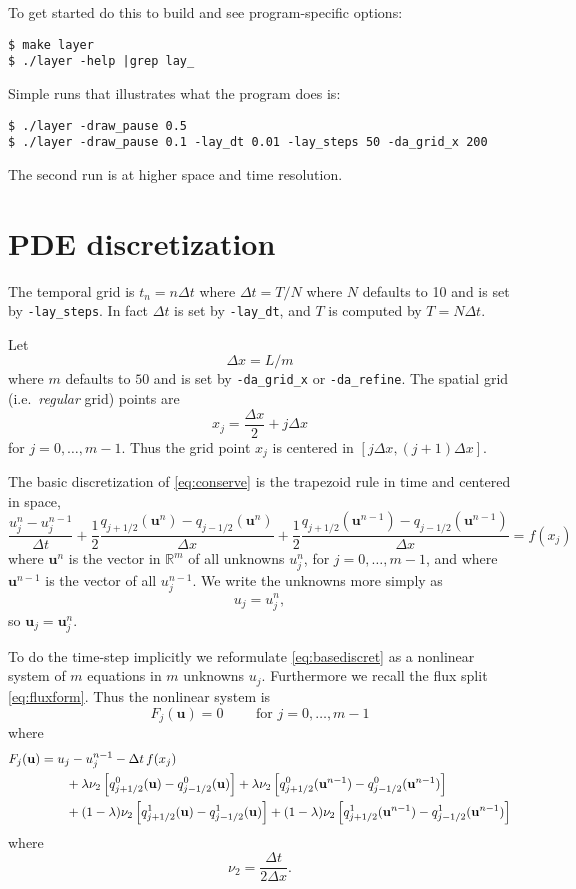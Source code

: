 \documentclass[11pt]{amsart}
\newcommand\bu{\mathbf{u}}
\newcommand\RR{\mathbb{R}}
\begin{document}
To get started do this to build and see program-specific options:
\begin{verbatim}
$ make layer
$ ./layer -help |grep lay_
\end{verbatim}
Simple runs that illustrates what the program does is:
\begin{verbatim}
$ ./layer -draw_pause 0.5
$ ./layer -draw_pause 0.1 -lay_dt 0.01 -lay_steps 50 -da_grid_x 200
\end{verbatim}
The second run is at higher space and time resolution.

\section{PDE discretization}

The temporal grid is $t_n = n\Delta t$ where $\Delta t = T/N$ where $N$ defaults to 10 and is set by \verb|-lay_steps|.  In fact $\Delta t$ is set by \verb|-lay_dt|, and $T$ is computed by $T=N\Delta t$.

Let
  $$\Delta x = L / m$$
where $m$ defaults to $50$ and is set by \verb|-da_grid_x| or \verb|-da_refine|.  The spatial grid (i.e.~\emph{regular} grid) points are
    $$x_j = \frac{\Delta x}{2} + j \Delta x$$
for $j=0,\dots,m-1$.  Thus the grid point $x_j$ is centered in $[j\Delta x,(j+1)\Delta x]$.

The basic discretization of \eqref{eq:conserve} is the trapezoid rule in time and centered in space,
\begin{equation}
\frac{u_j^n - u_j^{n-1}}{\Delta t} + \frac{1}{2} \frac{q_{j+1/2}(\bu^n) - q_{j-1/2}(\bu^n)}{\Delta x} + \frac{1}{2} \frac{q_{j+1/2}(\bu^{n-1}) - q_{j-1/2}(\bu^{n-1})}{\Delta x} = f(x_j) \label{eq:basediscret}
\end{equation}
where $\bu^n$ is the vector in $\RR^m$ of all unknowns $u_j^n$, for $j=0,\dots,m-1$, and where $\bu^{n-1}$ is the vector of all $u_j^{n-1}$.  We write the unknowns more simply as
  $$u_j = u_j^n,$$
so $\bu_j = \bu_j^n$.

To do the time-step implicitly we reformulate \eqref{eq:basediscret} as a nonlinear system of $m$ equations in $m$ unknowns $u_j$.  Furthermore we recall the flux split \eqref{eq:fluxform}.  Thus the nonlinear system is
\begin{equation}
F_j(\bu) = 0 \qquad \text{ for } j = 0,\dots,m-1
\end{equation}
where
\begin{align}
F_j(\bu) &= u_j - u_j^{n-1} - \Delta t\,f(x_j)  \label{eq:defineFj} \\
   &\qquad + \lambda \nu_2 \left[q^0_{j+1/2}(\bu) - q^0_{j-1/2}(\bu)\right] + \lambda \nu_2 \left[q^0_{j+1/2}(\bu^{n-1}) - q^0_{j-1/2}(\bu^{n-1})\right] \notag \\
   &\qquad + (1-\lambda) \nu_2 \left[q^1_{j+1/2}(\bu) -  q^1_{j-1/2}(\bu)\right] + (1-\lambda) \nu_2 \left[q^1_{j+1/2}(\bu^{n-1}) - q^1_{j-1/2}(\bu^{n-1})\right] \notag
\end{align}
where
    $$\nu_2 = \frac{\Delta t}{2\Delta x}.$$
\end{document}
